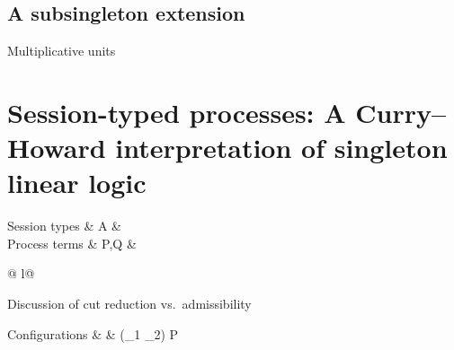 \subsection{A subsingleton extension}

Multiplicative units


\section{Session-typed processes: A Curry--Howard interpretation of singleton linear logic}

\begin{syntax*}
  Session types &
    A & \alpha \mid {} \mid {}
  \\
  Process terms &
    P,Q &  \mid \fwd
            \begin{array}[t]{@{{} \mid {}}l@{}}
              \selectR{\kay} \mid {} \\
               \mid \selectL{\kay}
            \end{array}
\end{syntax*}


Discussion of cut reduction vs.\ admissibility

\begin{syntax*}
  Configurations &
    \cnf & \cnfe \mid (\cnf_1 \cc \cnf_2) \mid P
\end{syntax*}

